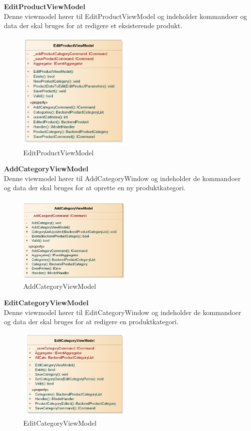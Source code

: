 \textbf{EditProductViewModel}\\
Denne viewmodel hører til EditProductViewModel og indeholder kommandoer og data der skal bruges for at redigere et eksisterende produkt.
\begin{figure}[H]
	\centering
	\includegraphics[width=0.5\textwidth]{Systemdesign/backend/klassebeskrivelser/Images/EditProductVM}
	\caption{EditProductViewModel}
	\label{fig:EditProductViewModel}
\end{figure}
\bigskip

\textbf{AddCategoryViewModel}\\
Denne viewmodel hører til AddCategoryWindow og indeholder de kommandoer og data der skal bruges for at oprette en ny produktkategori.
\begin{figure}[H]
	\centering
	\includegraphics[width=0.5\textwidth]{Systemdesign/backend/klassebeskrivelser/Images/AddCategoryVM}
	\caption{AddCategoryViewModel}
	\label{fig:AddCategoryViewModel}
\end{figure}
\bigskip

\textbf{EditCategoryViewModel}\\
Denne viewmodel hører til EditCategoryWindow og indeholder de kommandoer og data der skal bruges for at redigere en produktkategori.
\begin{figure}[H]
	\centering
	\includegraphics[width=0.5\textwidth]{Systemdesign/backend/klassebeskrivelser/Images/EditCategoryVM}
	\caption{EditCategoryViewModel}
	\label{fig:EditCategoryViewModel}
\end{figure}
\bigskip


